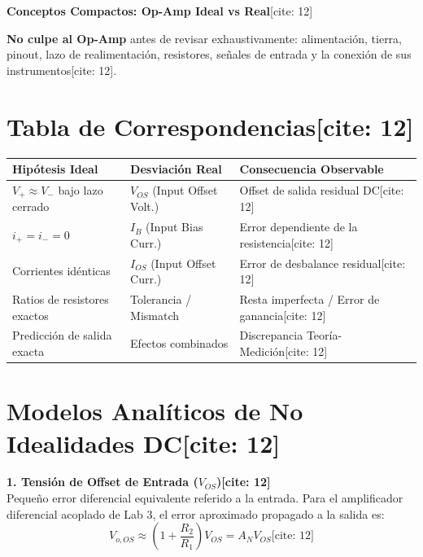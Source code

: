 \documentclass[11pt, a4paper]{article}
\begin{document}
\begin{center}
    \Large\textbf{\textcolor{ucbblue}{Conceptos Compactos: Op-Amp Ideal vs Real}}[cite: 12]
\end{center}

\begin{tcolorbox}[colback=yellow!5, colframe=ucbblue, title=\textbf{Regla Diagnóstica de Oro}]
    \textbf{No culpe al Op-Amp} antes de revisar exhaustivamente: alimentación, tierra, pinout, lazo de realimentación, resistores, señales de entrada y la conexión de sus instrumentos[cite: 12].
\end{tcolorbox}

\section*{Tabla de Correspondencias[cite: 12]}
\begin{table}[h]
    \centering
    \renewcommand{\arraystretch}{1.5}
    \begin{tabularx}{\textwidth}{>{\raggedright\arraybackslash\hsize=0.8\hsize}X >{\raggedright\arraybackslash\hsize=0.8\hsize}X >{\raggedright\arraybackslash\hsize=1.4\hsize}X}
    \toprule
    \rowcolor[HTML]{EFEFEF}
    \textbf{Hipótesis Ideal} & \textbf{Desviación Real} & \textbf{Consecuencia Observable} \\ \midrule
    $V_+ \approx V_-$ bajo lazo cerrado & $V_{OS}$ (Input Offset Volt.) & Offset de salida residual DC[cite: 12] \\
    $i_+ = i_- = 0$ & $I_B$ (Input Bias Curr.) & Error dependiente de la resistencia[cite: 12] \\
    Corrientes idénticas & $I_{OS}$ (Input Offset Curr.) & Error de desbalance residual[cite: 12] \\
    Ratios de resistores exactos & Tolerancia / Mismatch & Resta imperfecta / Error de ganancia[cite: 12] \\
    Predicción de salida exacta & Efectos combinados & Discrepancia Teoría-Medición[cite: 12] \\
    \bottomrule
    \end{tabularx}
\end{table}

\section*{Modelos Analíticos de No Idealidades DC[cite: 12]}
\textbf{1. Tensión de Offset de Entrada ($V_{OS}$)[cite: 12]} \\
Pequeño error diferencial equivalente referido a la entrada. Para el amplificador diferencial acoplado de Lab 3, el error aproximado propagado a la salida es:
\begin{equation*}
    V_{o,OS} \approx \left(1 + \frac{R_2}{R_1}\right)V_{OS} = A_N V_{OS} \text{[cite: 12]}
\end{equation*}
\end{document}
